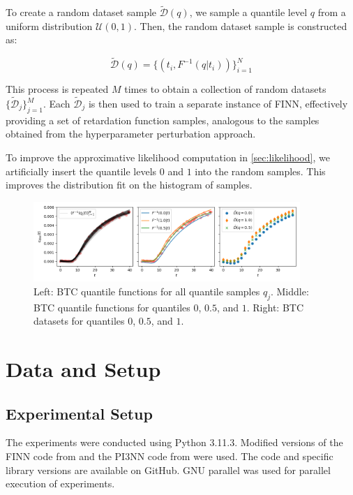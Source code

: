 \documentclass{article}
\begin{document}
To create a random dataset sample $\tilde{\mathcal{D}}(q)$, we sample a quantile level $q$ from a uniform distribution $\mathcal{U}(0, 1)$. Then, the random dataset sample is constructed as:

$$
\tilde{\mathcal{D}}(q) = \{ (t_i, F^{-1}(q | t_i) ) \}_{i=1}^N
$$

This process is repeated $M$ times to obtain a collection of random datasets $\{\tilde{\mathcal{D}}_j\}_{j=1}^M$. Each $\tilde{\mathcal{D}}_j$ is then used to train a separate instance of FINN, effectively providing a set of retardation function samples, analogous to the samples obtained from the hyperparameter perturbation approach.

To improve the approximative likelihood computation in \ref{sec:likelihood}, we artificially insert the quantile levels $0$ and $1$ into the random samples. This improves the distribution fit on the histogram of samples.

\begin{figure}
    \centering
    \includegraphics[width=0.9\textwidth]{figs/btc_dataspan_quantiles.png}
    \caption{Left: BTC quantile functions for all quantile samples $q_j$. Middle: BTC quantile functions for quantiles $0$, $0.5$, and $1$. Right: BTC datasets for quantiles $0$, $0.5$, and $1$.}
    \label{fig:btc_dataspan_quantiles}
\end{figure}



\section{Data and Setup}

\subsection{Experimental Setup}
The experiments were conducted using Python 3.11.3. Modified versions of the FINN code from \textcite{finn} and the PI3NN code from \textcite{pi3nn} were used. The code and specific library versions are available on GitHub. GNU parallel \cite{tange_2023_10199085} was used for parallel execution of experiments. %
\end{document}
